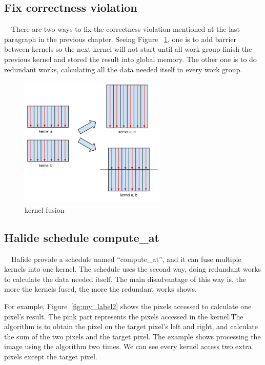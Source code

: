\documentclass{sigplanconf}
\begin{document}
\subsection{Fix correctness violation}
\quad\ \ There are two ways to fix the correctness violation mentioned at the last paragraph in the previous chapter. Seeing Figure
~\ref{fig:my_label1}, one is to add barrier between kernels so the next kernel will not start until all work group finish the previous kernel and stored the result into global memory. The other one is to do redundant works, calculating all the data needed itself in every work group.

\begin{figure}[hbtp]
\centering
\includegraphics[width=7cm]{img/kernel-fusion.png}
\caption{kernel fusion}
\label{fig:my_label1}
\end{figure}

\subsection{Halide schedule compute\_at}
\quad\ \ Halide provide a schedule named “compute\_at”, and it can fuse multiple kernels into one kernel. The schedule uses the second way, doing redundant works to calculate the data needed itself. The main disadvantage of this way is, the more the kernels fused, the more the redundant works shows.

	For example, Figure~\ref{fig:my_label2} shows the pixels accessed to calculate one pixel’s result. The pink part represents the pixels accessed in the kernel.The algorithm is to obtain the pixel on the target pixel’s left and right, and calculate the sum of the two pixels and the target pixel. The example shows processing the image using the algorithm two times. We can see every kernel access two extra pixels except the target pixel.
	
\end{document}
